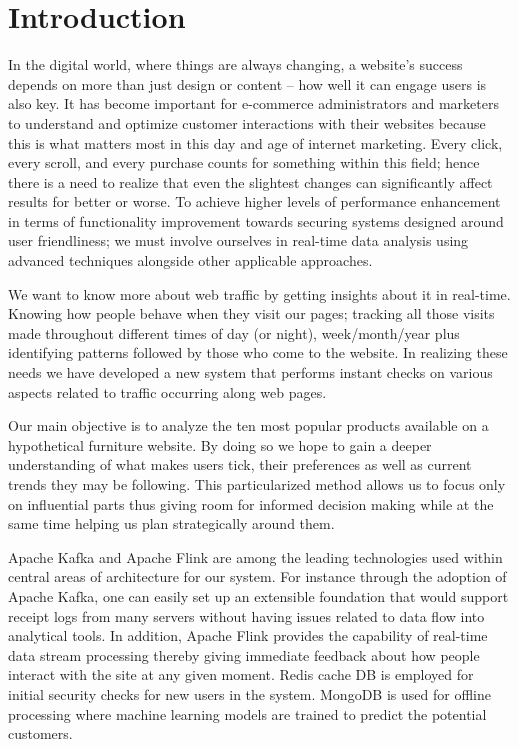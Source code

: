\documentclass[conference]{IEEEtran}
\begin{document}
\section{Introduction}
In the digital world, where things are always changing, a website’s success depends on more than just design or content – how well it can engage users is also key. It has become important for e-commerce administrators and marketers to understand and optimize customer interactions with their websites because this is what matters most in this day and age of internet marketing. Every click, every scroll, and every purchase counts for something within this field; hence there is a need to realize that even the slightest changes can significantly affect results for better or worse. To achieve higher levels of performance enhancement in terms of functionality improvement towards securing systems designed around user friendliness; we must involve ourselves in real-time data analysis using advanced techniques alongside other applicable approaches.

We want to know more about web traffic by getting insights about it in real-time. Knowing how people behave when they visit our pages; tracking all those visits made throughout different times of day (or night), week/month/year plus identifying patterns followed by those who come to the website. In realizing these needs we have developed a new system that performs instant checks on various aspects related to traffic occurring along web pages.

Our main objective is to analyze the ten most popular products available on a hypothetical furniture website. By doing so we hope to gain a deeper understanding of what makes users tick, their preferences as well as current trends they may be following. This particularized method allows us to focus only on influential parts thus giving room for informed decision making while at the same time helping us plan strategically around them.

Apache Kafka and Apache Flink are among the leading technologies used within central areas of architecture for our system. For instance through the adoption of Apache Kafka, one can easily set up an extensible foundation that would support receipt logs from many servers without having issues related to data flow into analytical tools. In addition, Apache Flink provides the capability of real-time data stream processing thereby giving immediate feedback about how people interact with the site at any given moment. Redis cache DB is employed for initial security checks for new users in the system. MongoDB is used for offline processing where machine learning models are trained to predict the potential customers.
\end{document}
